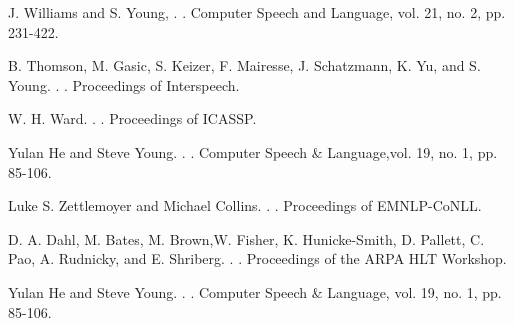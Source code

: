 \documentclass[11pt]{article}
\begin{document}
\begin{thebibliography}{}

J. Williams and S. Young, 
.
.
\newblock Computer Speech and Language, vol. 21, no. 2, pp. 231-422.

B. Thomson, M. Gasic, S. Keizer, F. Mairesse, J. Schatzmann,
K. Yu, and S. Young.
.
.
\newblock Proceedings of Interspeech.

W. H. Ward.
.
.
\newblock Proceedings of ICASSP.

Yulan He and Steve Young.
.
.
\newblock Computer Speech \& Language,vol. 19, no. 1, pp. 85-106.

Luke S. Zettlemoyer and Michael Collins.
.
.
\newblock Proceedings of EMNLP-CoNLL.

D. A. Dahl, M. Bates, M. Brown,W. Fisher, K. Hunicke-Smith,
D. Pallett, C. Pao, A. Rudnicky, and E. Shriberg.
.
.
\newblock Proceedings of the ARPA HLT Workshop.

Yulan He and Steve Young.
.
.
\newblock Computer Speech \& Language, vol. 19, no. 1, pp. 85-106.

\end{thebibliography}
\end{document}
